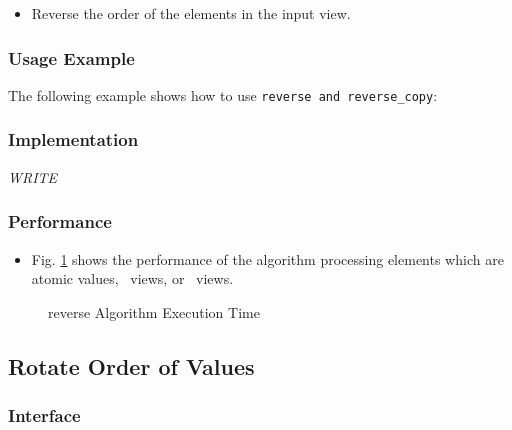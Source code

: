 \begin{itemize}
\item
Reverse the order of the elements in the input view. 
\end{itemize}

\subsubsection{Usage Example} %

The following example shows how to use \texttt{reverse and reverse\_copy}:

 
\subsubsection{Implementation} %

\textit{WRITE}

\subsubsection{Performance} %

\begin{itemize}
\item
Fig. \ref{fig:rev-alg-exec-exper}
shows the performance of the algorithm processing
elements which are atomic values, \stl\ views, or \stapl\ views.
\end{itemize}

\begin{figure}[p]
\caption{reverse Algorithm Execution Time}
\label{fig:rev-alg-exec-exper}
\end{figure}


\subsection{Rotate Order of Values} \label{sec-reord-rotate}

\subsubsection{Interface} %

